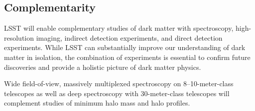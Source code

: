 \documentclass[12pt]{article}
\begin{document}
\vspace{-1em} \subsection*{Complementarity} \vspace{-0.5em}

LSST will enable complementary studies of dark matter with spectroscopy, high-resolution imaging, indirect detection experiments, and direct detection experiments.
While LSST can substantially improve our understanding of dark matter in isolation, the combination of experiments is essential to confirm future discoveries and provide a holistic picture of dark matter physics.



Wide field-of-view, massively multiplexed spectroscopy on 8--10-meter-class telescopes as well as deep spectroscopy with 30-meter-class telescopes will complement studies of minimum halo mass and halo profiles.
\end{document}
